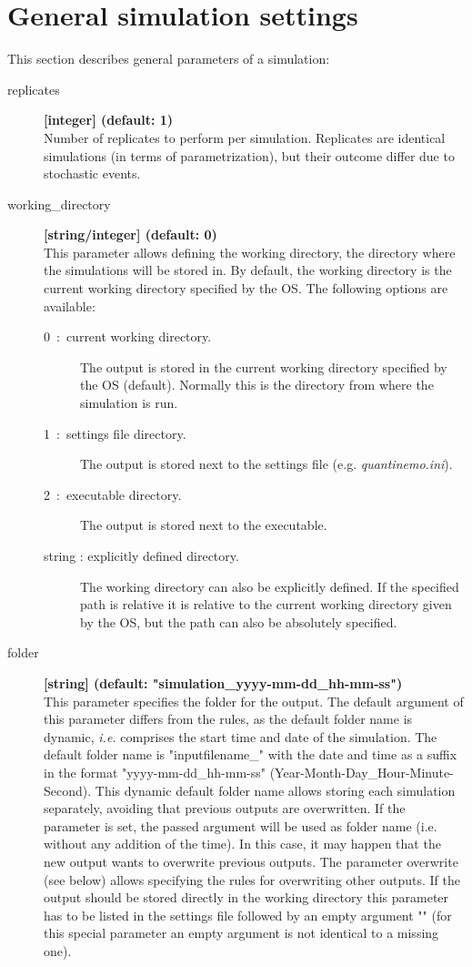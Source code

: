 \documentclass[letterpaper,12pt,oneside]{book}
\begin{document}
\chapter{General simulation settings}\label{chap:GeneralSimulationSettings}
This section describes general parameters of a simulation: 
\begin{description}

 
\item[replicates]\textbf{[integer] (default: 1)}\\
Number of replicates to perform per simulation. Replicates are identical simulations (in terms of parametrization), but their outcome differ due to stochastic events. 

\item[working\_directory]\textbf{[string/integer] (default: 0)}\\
This parameter allows defining the working directory, the directory where the simulations will be stored in. By default, the working directory is the current working directory specified by the OS. The following options are available:
\begin{description}
\item[0~:~current working directory.] The output is stored in the current working directory specified by the OS (default). Normally this is the directory from where the simulation is run. 
\item[1~:~settings file directory.] The output is stored next to the settings file (e.g. \textit{quantinemo.ini}).
\item[2~:~executable directory.] The output is stored next to the executable.  
\item[string : explicitly defined directory.] The working directory can also be explicitly defined. If the specified path is relative it is relative to the current working directory given by the OS, but the path can also be absolutely specified.
\end{description}


\item[folder]\textbf{[string] (default: "simulation\_yyyy-mm-dd\_hh-mm-ss")}\\
This parameter specifies the folder for the output. The default argument of this parameter differs from the rules, as the default folder name is dynamic, \textit{i.e.} comprises the start time and date of the simulation. The default folder name is "inputfilename\_" with the date and time as a suffix in the format "yyyy-mm-dd\_hh-mm-ss" (Year-Month-Day\_Hour-Minute-Second). This dynamic default folder name allows storing each simulation separately, avoiding that previous outputs are overwritten. If the parameter is set, the passed argument will be used as folder name (i.e. without any addition of the time). In this case, it may happen that the new output wants to overwrite previous outputs. The parameter \textsf{overwrite} (see below) allows specifying the rules for overwriting other outputs. If the output should be stored directly in the working directory this parameter has to be listed in the settings file followed by an empty argument "" (for this special parameter an empty argument is not identical to a missing one).



\end{description}
\end{document}
